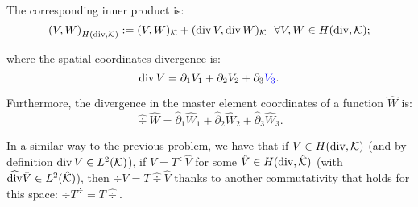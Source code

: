 \noindent The corresponding inner product is:
% 
\begin{equation}
    \left(V,W\right)_{H(\div,\mcK)}:=(V,W)_{\mcK}+(\div V,\div W)_{\mcK}\ \ \forall V,W\in H(\div,\mcK);
\end{equation}

\noindent where the spatial-coordinates divergence is:
\begin{equation}
    \div V=\partial_1 V_1+\partial_2 V_2+\partial_3 {\color{blue}V_3}.
\end{equation}

\noindent Furthermore, the divergence in the master element coordinates of a function $\hat{W}$ is:
% 
\begin{equation}
    \widehat{\div}\hat{W}=\hat{\partial}_1 \hat{W}_1+\hat{\partial}_2 \hat{W}_2+\hat{\partial}_3 \hat{W}_3.
\end{equation}

In a similar way to the previous problem, we have that if $V\in\HSo(\div,\mcK)$
{\color{blue} (and by definition $\div V\in\Leb^2(\mcK)$), if  $V=T^{\div}\hat{V}$ for some $\hat{V}\in\HSo(\div,\hatK)$ (with $\widehat{\div}\hat{V}\in\Leb^2(\hatK)$), then $\div V=T\widehat{\div}\hat{V}$ thanks to another commutativity that holds for this space: $\div T^{\div}=T\widehat{\div}$.}

